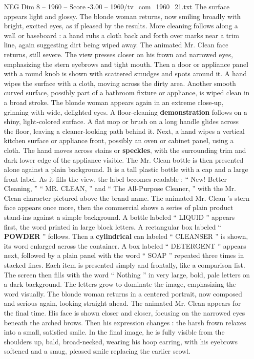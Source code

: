 \begin{textsample}{NEG Dim 8 – 1960 – Score -3.00 – 1960/tv\_com\_1960\_21.txt}
The surface appears light and glossy.
The blonde woman returns, now smiling broadly with bright, excited eyes, as if pleased by the results.
More cleaning follows along a wall or baseboard : a hand rubs a cloth back and forth over marks near a trim line, again suggesting dirt being wiped away.
The animated Mr.
Clean face returns, still severe.
The view presses closer on his frown and narrowed eyes, emphasizing the stern eyebrows and tight mouth.
Then a door or appliance panel with a round knob is shown with scattered smudges and spots around it.
A hand wipes the surface with a cloth, moving across the dirty area.
Another smooth curved surface, possibly part of a bathroom fixture or appliance, is wiped clean in a broad stroke.
The blonde woman appears again in an extreme close-up, grinning with wide, delighted eyes.
A floor-cleaning \textbf{demonstration} follows on a shiny, light-colored surface.
A flat mop or brush on a long handle glides across the floor, leaving a cleaner-looking path behind it.
Next, a hand wipes a vertical kitchen surface or appliance front, possibly an oven or cabinet panel, using a cloth.
The hand moves across stains or \textbf{speckles}, with the surrounding trim and dark lower edge of the appliance visible.
The Mr.
Clean bottle is then presented alone against a plain background.
It is a tall plastic bottle with a cap and a large front label.
As it fills the view, the label becomes readable : “ New!
Better Cleaning, ” “ MR.
CLEAN, ” and “ The All-Purpose Cleaner, ” with the Mr.
Clean character pictured above the brand name.
The animated Mr.
Clean ’s stern face appears once more, then the commercial shows a series of plain product stand-ins against a simple background.
A bottle labeled “ LIQUID ” appears first, the word printed in large block letters.
A rectangular box labeled “ \textbf{POWDER} ” follows.
Then a \textbf{cylindrical} can labeled “ CLEANSER ” is shown, its word enlarged across the container.
A box labeled “ DETERGENT ” appears next, followed by a plain panel with the word “ SOAP ” repeated three times in stacked lines.
Each item is presented simply and frontally, like a comparison list.
The screen then fills with the word “ Nothing ” in very large, bold, pale letters on a dark background.
The letters grow to dominate the image, emphasizing the word visually.
The blonde woman returns in a centered portrait, now composed and serious again, looking straight ahead.
The animated Mr.
Clean appears for the final time.
His face is shown closer and closer, focusing on the narrowed eyes beneath the arched brows.
Then his expression changes : the harsh frown relaxes into a small, satisfied smile.
In the final image, he is fully visible from the shoulders up, bald, broad-necked, wearing his hoop earring, with his eyebrows softened and a smug, pleased smile replacing the earlier scowl.

\end{textsample}
